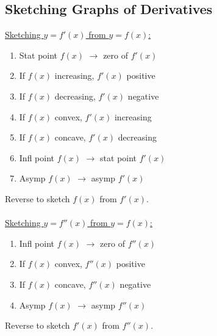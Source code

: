\documentclass[10pt, a4paper, titlepage]{article}
\begin{document}
\begin{multicols*}{3}
	\subsection{Sketching Graphs of Derivatives}
	\underline{Sketching $y=f'(x)$ from $y=f(x)$:}
	\begin{enumerate}
		\item Stat point $f(x)$ $\rightarrow$ zero of $f'(x)$
		\item If $f(x)$ increasing, $f'(x)$ positive
		\item If $f(x)$ decreasing, $f'(x)$ negative
		\item If $f(x)$ convex, $f'(x)$ increasing
		\item If $f(x)$ concave, $f'(x)$ decreasing
		\item Infl point $f(x)$ $\rightarrow$ stat point $f'(x)$
		\item Asymp $f(x)$ $\rightarrow$ asymp $f'(x)$
	\end{enumerate}
	Reverse to sketch $f(x)$ from $f'(x)$.\\\\
	\underline{Sketching $y=f''(x)$ from $y=f(x)$:}
	\begin{enumerate}
		\item Infl point $f(x)$ $\rightarrow$ zero of $f''(x)$
		\item If $f(x)$ convex, $f''(x)$ positive
		\item If $f(x)$ concave, $f''(x)$ negative
		\item Asymp $f(x)$ $\rightarrow$ asymp $f''(x)$
	\end{enumerate}
	Reverse to sketch $f'(x)$ from $f''(x)$.\\

	\dotfill

\end{multicols*}
\end{document}
